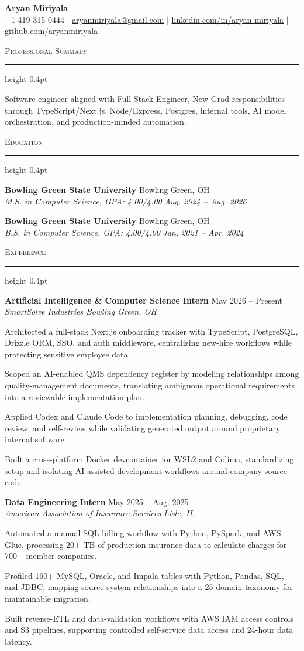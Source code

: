 \documentclass[letterpaper,11pt]{article}
\newcommand{\resumesection}[1]{%
  \par\vspace{2pt}%
  {\large\scshape #1}\par\vspace{2pt}%
  \hrule height 0.4pt\vspace{2pt}%
}
\newcommand{\resumeSubheading}[4]{
  \textbf{#1} \hfill #2\\
  \textit{#3} \hfill \textit{#4}
}
\begin{document}
\begin{center}
  {\LARGE \textbf{Aryan Miriyala}}\\[-1pt]
  \small
  +1 419-315-0444 $|$
  \href{mailto:aryanmiriyala@gmail.com}{aryanmiriyala@gmail.com} $|$
  \href{https://www.linkedin.com/in/aryan-miriyala-7788a21b6/}{linkedin.com/in/aryan-miriyala} $|$
  \href{https://github.com/aryanmiriyala}{github.com/aryanmiriyala}
\end{center}\vspace{-10pt}

\resumesection{Professional Summary}
Software engineer aligned with Full Stack Engineer, New Grad responsibilities through TypeScript/Next.js, Node/Express, Postgres, internal tools, AI model orchestration, and production-minded automation.

\resumesection{Education}
\resumeSubheading
{Bowling Green State University}{Bowling Green, OH}
{M.S. in Computer Science, GPA: 4.00/4.00}{Aug. 2024 -- Aug. 2026}

\resumeSubheading
{Bowling Green State University}{Bowling Green, OH}
{B.S. in Computer Science, GPA: 4.00/4.00}{Jan. 2021 -- Apr. 2024}

\resumesection{Experience}
\resumeSubheading
{Artificial Intelligence \& Computer Science Intern}{May 2026 -- Present}
{SmartSolve Industries}{Bowling Green, OH}
\begin{tightitemize}
  \item Architected a full-stack Next.js onboarding tracker with TypeScript, PostgreSQL, Drizzle ORM, SSO, and auth middleware, centralizing new-hire workflows while protecting sensitive employee data.
  \item Scoped an AI-enabled QMS dependency register by modeling relationships among quality-management documents, translating ambiguous operational requirements into a reviewable implementation plan.
  \item Applied Codex and Claude Code to implementation planning, debugging, code review, and self-review while validating generated output around proprietary internal software.
  \item Built a cross-platform Docker devcontainer for WSL2 and Colima, standardizing setup and isolating AI-assisted development workflows around company source code.
\end{tightitemize}

\resumeSubheading
{Data Engineering Intern}{May 2025 -- Aug. 2025}
{American Association of Insurance Services}{Lisle, IL}
\begin{tightitemize}
  \item Automated a manual SQL billing workflow with Python, PySpark, and AWS Glue, processing 20+ TB of production insurance data to calculate charges for 700+ member companies.
  \item Profiled 160+ MySQL, Oracle, and Impala tables with Python, Pandas, SQL, and JDBC, mapping source-system relationships into a 25-domain taxonomy for maintainable migration.
  \item Built reverse-ETL and data-validation workflows with AWS IAM access controls and S3 pipelines, supporting controlled self-service data access and 24-hour data latency.
\end{tightitemize}
\end{document}
